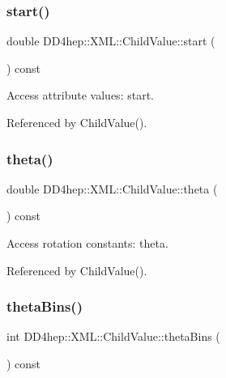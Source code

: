 \subsubsection{\texorpdfstring{start()}{start()}}
{\footnotesize\ttfamily double D\+D4hep\+::\+X\+M\+L\+::\+Child\+Value\+::start (\begin{DoxyParamCaption}{ }\end{DoxyParamCaption}) const}



Access attribute values\+: start. 



Referenced by Child\+Value().

\hypertarget{struct_d_d4hep_1_1_x_m_l_1_1_child_value_ae19135e507ffba981e64987b9a082743}{}\label{struct_d_d4hep_1_1_x_m_l_1_1_child_value_ae19135e507ffba981e64987b9a082743} 
\subsubsection{\texorpdfstring{theta()}{theta()}}
{\footnotesize\ttfamily double D\+D4hep\+::\+X\+M\+L\+::\+Child\+Value\+::theta (\begin{DoxyParamCaption}{ }\end{DoxyParamCaption}) const}



Access rotation constants\+: theta. 



Referenced by Child\+Value().

\hypertarget{struct_d_d4hep_1_1_x_m_l_1_1_child_value_ace00574a2ca3df185d062d87f5589ac5}{}\label{struct_d_d4hep_1_1_x_m_l_1_1_child_value_ace00574a2ca3df185d062d87f5589ac5} 
\subsubsection{\texorpdfstring{theta\+Bins()}{thetaBins()}}
{\footnotesize\ttfamily int D\+D4hep\+::\+X\+M\+L\+::\+Child\+Value\+::theta\+Bins (\begin{DoxyParamCaption}{ }\end{DoxyParamCaption}) const}




